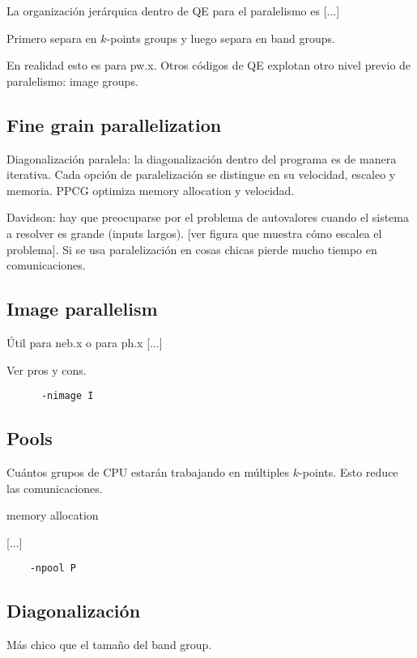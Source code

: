  La organización jerárquica dentro de QE para el paralelismo es
  [...]

  Primero separa en $k$-points groups y luego separa en band groups.

  En realidad esto es para pw.x. Otros códigos de QE explotan otro nivel previo de paralelismo: image groups.

\subsection{Fine grain parallelization}

  Diagonalización paralela: la diagonalización dentro del programa es de manera iterativa. Cada opción de paralelización se distingue en su velocidad, escaleo y memoria. PPCG optimiza memory allocation y velocidad.

  Davidson: hay que preocuparse por el problema de autovalores cuando el sistema a resolver es grande (inputs largos). [ver figura que muestra cómo escalea el problema]. Si se usa paralelización en cosas chicas pierde mucho tiempo en comunicaciones.

\subsection{Image parallelism}

  Útil para neb.x o para ph.x [...]

  Ver pros y cons.
    \begin{verbatim}
      -nimage I
    \end{verbatim}

\subsection{Pools}

  Cuántos grupos de CPU estarán trabajando en múltiples $k$-points. Esto reduce las comunicaciones.

  memory allocation

  [...]

  \begin{verbatim}
    -npool P
  \end{verbatim}

\subsection{Diagonalización}

  Más chico que el tamaño del band group.

